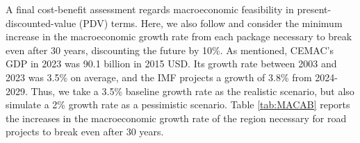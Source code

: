 \documentclass[a4paper]{article}
\begin{document}
A final cost-benefit assessment regards macroeconomic feasibility in present-discounted-value (PDV) terms. Here, we also follow \citet{krantz2024optimal} and consider the minimum increase in the macroeconomic growth rate from each package necessary to break even after 30 years, discounting the future by 10\%. As mentioned, CEMAC's GDP in 2023 was 90.1 billion in 2015 USD. Its growth rate between 2003 and 2023 was 3.5\% on average, and the IMF projects a growth of 3.8\% from 2024-2029. Thus, we take a 3.5\% baseline growth rate as the realistic scenario, but also simulate a 2\% growth rate as a pessimistic scenario. Table \ref{tab:MACAB} reports the increases in the macroeconomic growth rate of the region necessary for road projects to break even after 30 years. 
\end{document}
